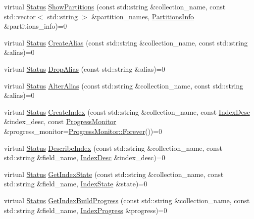 \begin{DoxyCompactItemize}
\item 
virtual \hyperlink{classmilvus_1_1_status}{Status} \hyperlink{classmilvus_1_1_milvus_client_a12b481158b57a806f8d341178348f735}{Show\+Partitions} (const std\+::string \&collection\+\_\+name, const std\+::vector$<$ std\+::string $>$ \&partition\+\_\+names, \hyperlink{namespacemilvus_affb31ba1d459f7fa231ffda305c08733}{Partitions\+Info} \&partitions\+\_\+info)=0
\item 
virtual \hyperlink{classmilvus_1_1_status}{Status} \hyperlink{classmilvus_1_1_milvus_client_ac60416ac8d3a1acee393d9d0194cc14e}{Create\+Alias} (const std\+::string \&collection\+\_\+name, const std\+::string \&alias)=0
\item 
virtual \hyperlink{classmilvus_1_1_status}{Status} \hyperlink{classmilvus_1_1_milvus_client_aef2fe7b13010cc57f5ae7235cf75252d}{Drop\+Alias} (const std\+::string \&alias)=0
\item 
virtual \hyperlink{classmilvus_1_1_status}{Status} \hyperlink{classmilvus_1_1_milvus_client_a0ffc68fca8e0e8756598336552406d9c}{Alter\+Alias} (const std\+::string \&collection\+\_\+name, const std\+::string \&alias)=0
\item 
virtual \hyperlink{classmilvus_1_1_status}{Status} \hyperlink{classmilvus_1_1_milvus_client_a9d56f35a497504a7dee610d368d22b7a}{Create\+Index} (const std\+::string \&collection\+\_\+name, const \hyperlink{classmilvus_1_1_index_desc}{Index\+Desc} \&index\+\_\+desc, const \hyperlink{classmilvus_1_1_progress_monitor}{Progress\+Monitor} \&progress\+\_\+monitor=\hyperlink{classmilvus_1_1_progress_monitor_afad65b07af8419780f2457992ee7ce7d}{Progress\+Monitor\+::\+Forever}())=0
\item 
virtual \hyperlink{classmilvus_1_1_status}{Status} \hyperlink{classmilvus_1_1_milvus_client_a58ed7015339719ab8dc7d6acad90d9a1}{Describe\+Index} (const std\+::string \&collection\+\_\+name, const std\+::string \&field\+\_\+name, \hyperlink{classmilvus_1_1_index_desc}{Index\+Desc} \&index\+\_\+desc)=0
\item 
virtual \hyperlink{classmilvus_1_1_status}{Status} \hyperlink{classmilvus_1_1_milvus_client_ad4abd1fc1153cd777a5080aa2ad8ca2b}{Get\+Index\+State} (const std\+::string \&collection\+\_\+name, const std\+::string \&field\+\_\+name, \hyperlink{classmilvus_1_1_index_state}{Index\+State} \&state)=0
\item 
virtual \hyperlink{classmilvus_1_1_status}{Status} \hyperlink{classmilvus_1_1_milvus_client_ace67cf6baedb06fe67badb5e499a3c45}{Get\+Index\+Build\+Progress} (const std\+::string \&collection\+\_\+name, const std\+::string \&field\+\_\+name, \hyperlink{classmilvus_1_1_index_progress}{Index\+Progress} \&progress)=0

\end{DoxyCompactItemize}
